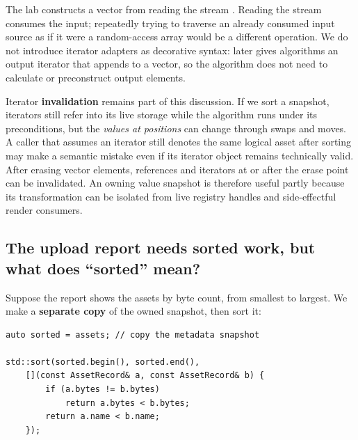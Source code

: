 The lab constructs a vector from  reading the stream . Reading the stream consumes the input; repeatedly trying to traverse an already consumed input source as if it were a random-access array would be a different operation. We do not introduce iterator adapters as decorative syntax:  later gives algorithms an output iterator that appends to a vector, so the algorithm does not need to calculate or preconstruct output elements.

Iterator \textbf{invalidation} remains part of this discussion. If we sort a snapshot, iterators still refer into its live storage while the algorithm runs under its preconditions, but the \emph{values at positions} can change through swaps and moves. A caller that assumes an iterator still denotes the same logical asset after sorting may make a semantic mistake even if its iterator object remains technically valid. After erasing vector elements, references and iterators at or after the erase point can be invalidated. An owning value snapshot is therefore useful partly because its transformation can be isolated from live registry handles and side-effectful render consumers.

\subsection{The upload report needs sorted work, but what does ``sorted'' mean?}\label{05-engine-i-ch006-the-upload-report-needs-sorted-work-but-what-does-sorted-mean}

\hypertarget{05-engine-i-ch006-the-upload-report-needs-sorted-work-but-what-does-sorted-mean}{}

Suppose the report shows the assets by byte count, from smallest to largest. We make a \textbf{separate copy} of the owned snapshot, then sort it:

\begin{verbatim}
auto sorted = assets; // copy the metadata snapshot

std::sort(sorted.begin(), sorted.end(),
    [](const AssetRecord& a, const AssetRecord& b) {
        if (a.bytes != b.bytes)
            return a.bytes < b.bytes;
        return a.name < b.name;
    });
\end{verbatim}

